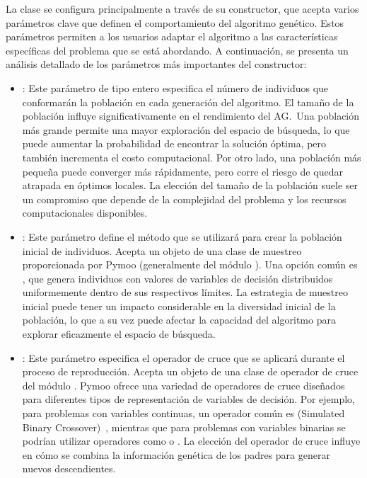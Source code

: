 La clase \texttt{} se configura principalmente a través de su constructor, que acepta varios parámetros clave que definen el comportamiento del algoritmo genético. Estos parámetros permiten a los usuarios adaptar el algoritmo a las características específicas del problema que se está abordando. A continuación, se presenta un análisis detallado de los parámetros más importantes del constructor:
\begin{itemize}
    \item \texttt{}: Este parámetro de tipo entero especifica el número de individuos que conformarán la población en cada generación del algoritmo. El tamaño de la población influye significativamente en el rendimiento del AG.\ Una población más grande permite una mayor exploración del espacio de búsqueda, lo que puede aumentar la probabilidad de encontrar la solución óptima, pero también incrementa el costo computacional. Por otro lado, una población más pequeña puede converger más rápidamente, pero corre el riesgo de quedar atrapada en óptimos locales. La elección del tamaño de la población suele ser un compromiso que depende de la complejidad del problema y los recursos computacionales disponibles.
    \item \texttt{}: Este parámetro define el método que se utilizará para crear la población inicial de individuos. Acepta un objeto de una clase de muestreo proporcionada por Pymoo (generalmente del módulo \texttt{}). Una opción común es \texttt{}, que genera individuos con valores de variables de decisión distribuidos uniformemente dentro de sus respectivos límites. La estrategia de muestreo inicial puede tener un impacto considerable en la diversidad inicial de la población, lo que a su vez puede afectar la capacidad del algoritmo para explorar eficazmente el espacio de búsqueda.
    \item \texttt{}: Este parámetro especifica el operador de cruce que se aplicará durante el proceso de reproducción. Acepta un objeto de una clase de operador de cruce del módulo \texttt{}. Pymoo ofrece una variedad de operadores de cruce diseñados para diferentes tipos de representación de variables de decisión. Por ejemplo, para problemas con variables continuas, un operador común es \texttt{} (Simulated Binary Crossover)~\cite{deb1995}, mientras que para problemas con variables binarias se podrían utilizar operadores como \texttt{} o \texttt{}. La elección del operador de cruce influye en cómo se combina la información genética de los padres para generar nuevos descendientes.

\end{itemize}
